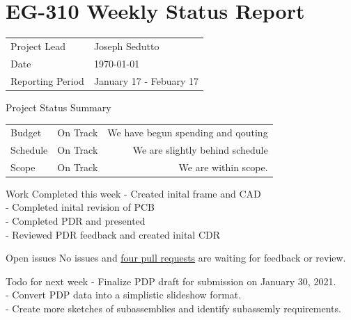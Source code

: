 \documentclass{scrartcl}
\begin{document}
\section*{EG-310 Weekly Status Report}
\begin{center}
    \begin{tabular}{ l l }
        Project Lead     & Joseph Sedutto          \\
        Date             & \today         \\
        Reporting Period & January 17 - Febuary 17
    \end{tabular}
\end{center}

\begin{defi}{Project Status Summary}{}
    \begin{tabular}{ l l r }
        Budget   & On Track & We have begun spending and qouting         \\
        Schedule & On Track & We are slightly behind schedule                     \\
        Scope    & On Track & We are within scope.
    \end{tabular}
\end{defi}

\begin{defi}{Work Completed this week}{}
    - Created inital frame and CAD \\
    - Completed inital revision of PCB \\
    - Completed PDR and presented \\
    - Reviewed PDR feedback and created inital CDR
\end{defi}

\begin{defi}{Open issues}{}
    No issues and \href{https://github.com/KenwoodFox/EG-310-InvertedPendulum/pulls}{four pull requests} are waiting for feedback or review.
\end{defi}

\begin{defi}{Todo for next week}{}
    - Finalize PDP draft for submission on January 30, 2021.  \\ 
    - Convert PDP data into a simplistic slideshow format. \\
    - Create more sketches of subassemblies and identify subassemly requirements.
\end{defi}
\end{document}
